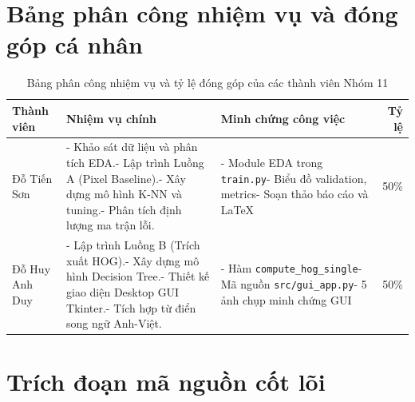 \documentclass[../DoAn.tex]{subfiles}
\begin{document}
\section{Bảng phân công nhiệm vụ và đóng góp cá nhân}
\begin{table}[H]
\centering
\small
\caption{Bảng phân công nhiệm vụ và tỷ lệ đóng góp của các thành viên Nhóm 11}
\label{tab:task_assignment}
\begin{tabular}{@{}p{3.0cm} p{5.0cm} p{4.6cm} r@{}}
\hline
\textbf{Thành viên} & \textbf{Nhiệm vụ chính} & \textbf{Minh chứng công việc} & \textbf{Tỷ lệ} \\ \hline
Đỗ Tiến Sơn & - Khảo sát dữ liệu và phân tích EDA.\newline - Lập trình Luồng A (Pixel Baseline).\newline - Xây dựng mô hình K-NN và tuning.\newline - Phân tích định lượng ma trận lỗi. & - Module EDA trong \texttt{train.py}\newline - Biểu đồ validation, metrics\newline - Soạn thảo báo cáo và LaTeX & 50\% \\ \hline
Đỗ Huy Anh Duy & - Lập trình Luồng B (Trích xuất HOG).\newline - Xây dựng mô hình Decision Tree.\newline - Thiết kế giao diện Desktop GUI Tkinter.\newline - Tích hợp từ điển song ngữ Anh-Việt. & - Hàm \texttt{compute\_hog\_single}\newline - Mã nguồn \texttt{src/gui\_app.py}\newline - 5 ảnh chụp minh chứng GUI & 50\% \\ \hline
\end{tabular}
\end{table}

\section{Trích đoạn mã nguồn cốt lõi}
\end{document}
